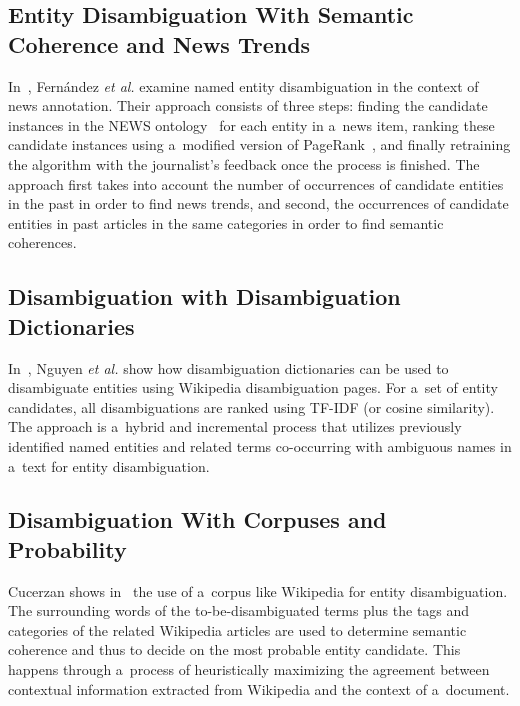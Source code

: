 \subsection{Entity Disambiguation With Semantic Coherence and News Trends}

In~\cite{fernandez2007identityrank},
Fernández \emph{et al.} examine named entity disambiguation
in the context of news annotation.
Their approach consists of three steps:
finding the candidate instances in the NEWS
ontology~\cite{fernandez2010newsontology}
for each entity in a~news item,
ranking these candidate instances
using a~modified version of
PageRank~\cite{brin1998pagerank},
and finally retraining the algorithm
with the journalist's feedback once the process is finished.
The approach first takes into account the number
of occurrences of candidate entities in the past
in order to find news trends,
and second, the occurrences of candidate entities
in past articles in the same categories
in order to find semantic coherences.

\subsection{Disambiguation with Disambiguation Dictionaries}

In~\cite{nguyen2008namedentity},
Nguyen \emph{et al.} show how disambiguation dictionaries
can be used to disambiguate entities
using Wikipedia disambiguation pages.
For a~set of entity candidates, all disambiguations are ranked
using TF-IDF (or cosine similarity).
The approach is a~hybrid and incremental process
that utilizes previously identified named entities
and related terms co-occurring with ambiguous names
in a~text for entity disambiguation.

\subsection{Disambiguation With Corpuses and Probability}

Cucerzan shows in~\cite{cucerzan2007largescale}
the use of a~corpus like Wikipedia for entity disambiguation.
The surrounding words of the to-be-disambiguated terms
plus the tags and categories of the related Wikipedia articles
are used to determine semantic coherence and thus
to decide on the most probable entity candidate.
This happens through a~process of heuristically maximizing
the agreement between contextual information
extracted from Wikipedia and the context of a~document.

